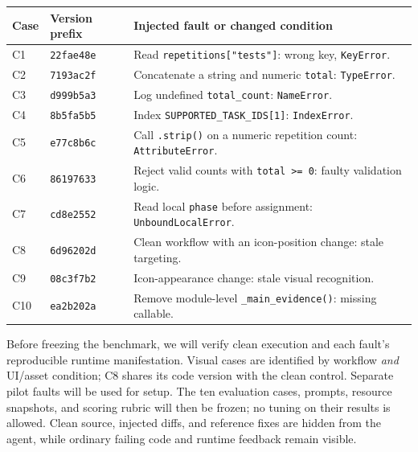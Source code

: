 \documentclass[10pt,a4paper]{article}
\begin{document}
\begingroup
\small
\renewcommand{\arraystretch}{1.12}
\begin{tabularx}{\linewidth}{@{}l l X@{}}
\toprule
Case & Version prefix & Injected fault or changed condition \\
\midrule
C1 & \texttt{22fae48e} & Read \texttt{repetitions["tests"]}: wrong key, \texttt{KeyError}. \\
C2 & \texttt{7193ac2f} & Concatenate a string and numeric \texttt{total}: \texttt{TypeError}. \\
C3 & \texttt{d999b5a3} & Log undefined \texttt{total\_count}: \texttt{NameError}. \\
C4 & \texttt{8b5fa5b5} & Index \texttt{SUPPORTED\_TASK\_IDS[1]}: \texttt{IndexError}. \\
C5 & \texttt{e77c8b6c} & Call \texttt{.strip()} on a numeric repetition count: \texttt{AttributeError}. \\
C6 & \texttt{86197633} & Reject valid counts with \texttt{total >= 0}: faulty validation logic. \\
C7 & \texttt{cd8e2552} & Read local \texttt{phase} before assignment: \texttt{UnboundLocalError}. \\
C8 & \texttt{6d96202d} & Clean workflow with an icon-position change: stale targeting. \\
C9 & \texttt{08c3f7b2} & Icon-appearance change: stale visual recognition. \\
C10 & \texttt{ea2b202a} & Remove module-level \texttt{\_main\_evidence()}: missing callable. \\
\bottomrule
\end{tabularx}
\endgroup

Before freezing the benchmark, we will verify clean execution and each fault's
reproducible runtime manifestation. Visual cases are identified by workflow
\emph{and} UI/asset condition; C8 shares its code version with the clean control.
Separate pilot faults will be used for setup. The ten evaluation cases, prompts,
resource snapshots, and scoring rubric will then be frozen; no tuning on their
results is allowed. Clean source, injected diffs, and reference fixes are hidden
from the agent, while ordinary failing code and runtime feedback remain visible.
\end{document}
